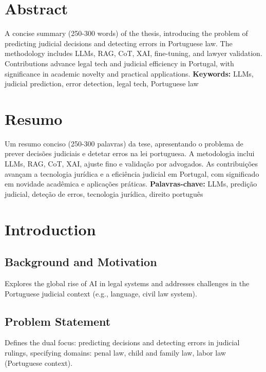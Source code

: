 \documentclass[11pt,a4paper,twoside,openright]{book}
\providecommand{\keywords}[1]{\textbf{Keywords:} #1}
\providecommand{\keywordsP}[1]{\textbf{Palavras-chave:} #1}
\begin{document}
\frontmatter

% 

\chapter*{Abstract}
A concise summary (250-300 words) of the thesis, introducing the problem of predicting judicial decisions and detecting errors in Portuguese law. The methodology includes LLMs, RAG, CoT, XAI, fine-tuning, and lawyer validation. Contributions advance legal tech and judicial efficiency in Portugal, with significance in academic novelty and practical applications.
\keywords{LLMs, judicial prediction, error detection, legal tech, Portuguese law}

\chapter*{Resumo}
Um resumo conciso (250-300 palavras) da tese, apresentando o problema de prever decisões judiciais e detetar erros na lei portuguesa. A metodologia inclui LLMs, RAG, CoT, XAI, ajuste fino e validação por advogados. As contribuições avançam a tecnologia jurídica e a eficiência judicial em Portugal, com significado em novidade acadêmica e aplicações práticas.
\keywordsP{LLMs, predição judicial, deteção de erros, tecnologia jurídica, direito português}

\renewcommand{\contentsname}{Table of Contents}
\tableofcontents
\listoffigures
\listoftables

\mainmatter

\chapter{Introduction}
\section{Background and Motivation}
Explores the global rise of AI in legal systems and addresses challenges in the Portuguese judicial context (e.g., language, civil law system).
\section{Problem Statement}
Defines the dual focus: predicting decisions and detecting errors in judicial rulings, specifying domains: penal law, child and family law, labor law (Portuguese context).
\end{document}
